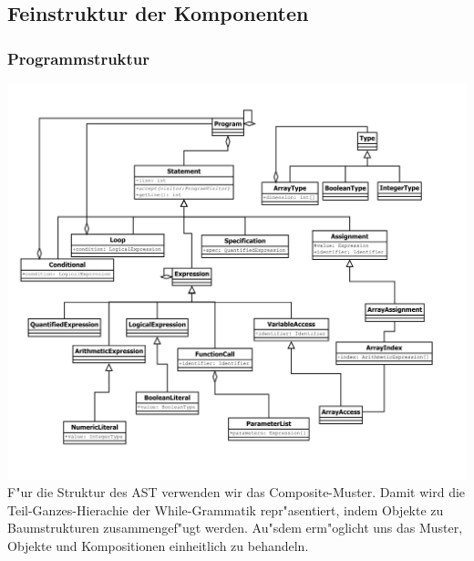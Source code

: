 \documentclass[10pt,a4paper,titlepage]{article}
\begin{document}
\subsection{Feinstruktur der Komponenten}

\subsubsection{Programmstruktur}

\includegraphics[scale=0.85]{images/AST.pdf} \\
F"ur die Struktur des AST verwenden wir das Composite-Muster. Damit wird die Teil-Ganzes-Hierachie der While-Grammatik repr"asentiert, indem Objekte zu Baumstrukturen zusammengef"ugt werden. Au"sdem erm"oglicht uns das Muster, Objekte und Kompositionen einheitlich zu behandeln. 
\end{document}
